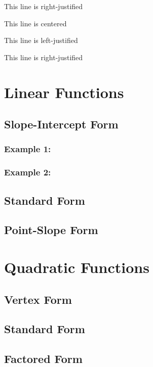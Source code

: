 \documentclass[11pt]{article}
\begin{document}
\begin{flushright}
    This line is right-justified
\end{flushright}

\tiny
This line is centered

This line is left-justified

This line is right-justified

\section{Linear Functions}
    \subsection{Slope-Intercept Form}
        \subsubsection{Example 1:}
        \subsubsection{Example 2:}
    \subsection{Standard Form}
    \subsection{Point-Slope Form}  
\section{Quadratic Functions} 
    \subsection{Vertex Form}
    \subsection{Standard Form}
    \subsection{Factored Form}
\end{document}
